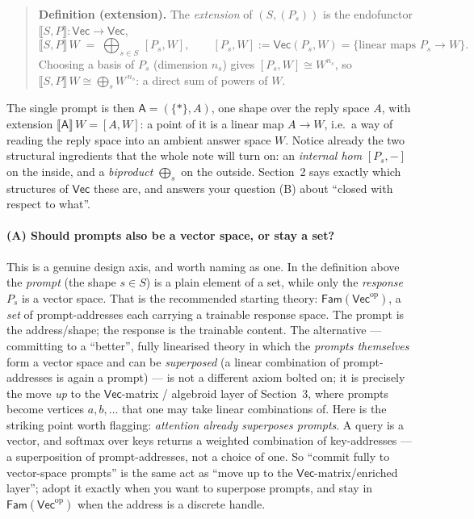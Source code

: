 \documentclass[11pt]{article}
\providecommand{\Vec}{}\renewcommand{\Vec}{\mathsf{Vec}}
\newcommand{\Fam}{\mathsf{Fam}}
\newcommand{\op}{\mathrm{op}}
\newcommand{\ext}[1]{\llbracket #1 \rrbracket}
\newcommand{\ihom}[2]{[#1,#2]}
\begin{document}
\begin{quote}
\textbf{Definition (extension).} The \emph{extension} of $(S,(P_s))$ is the
endofunctor $\ext{S,P}\colon\Vec\to\Vec$,
\[
  \ext{S,P}\,W \;=\; \bigoplus_{s\in S}\, \ihom{P_s}{W},
  \qquad \ihom{P_s}{W} := \Vec(P_s,W) = \{\text{linear maps } P_s\to W\}.
\]
Choosing a basis of $P_s$ (dimension $n_s$) gives $\ihom{P_s}{W}\cong W^{n_s}$, so
$\ext{S,P}\,W \cong \bigoplus_s W^{\,n_s}$: a direct sum of powers of $W$.
\end{quote}

The single prompt is then $\mathsf A=(\{*\},A)$, one shape over the reply space $A$,
with extension $\ext{\mathsf A}\,W=\ihom{A}{W}$: a point of it is a linear map
$A\to W$, i.e.\ a way of reading the reply space into an ambient answer space $W$.
Notice already the two structural ingredients that the whole note will turn on: an
\emph{internal hom} $\ihom{P_s}{-}$ on the inside, and a \emph{biproduct}
$\bigoplus_s$ on the outside. Section~2 says exactly which structures of $\Vec$
these are, and answers your question (B) about ``closed with respect to what''.

\paragraph{(A) Should prompts also be a vector space, or stay a set?}
This is a genuine design axis, and worth naming as one. In the definition above the
\emph{prompt} (the shape $s\in S$) is a plain element of a set, while only the
\emph{response} $P_s$ is a vector space. That is the recommended starting theory:
$\Fam(\Vec^\op)$, a \emph{set} of prompt-addresses each carrying a trainable response
space. The prompt is the address/shape; the response is the trainable content. The
alternative --- committing to a ``better'', fully linearised theory in which the
\emph{prompts themselves} form a vector space and can be \emph{superposed} (a linear
combination of prompt-addresses is again a prompt) --- is not a different axiom bolted
on; it is precisely the move \emph{up} to the $\Vec$-matrix / algebroid layer of
Section~3, where prompts become vertices $a,b,\dots$ that one may take linear
combinations of. Here is the striking point worth flagging: \emph{attention already
superposes prompts}. A query is a vector, and softmax over keys returns a weighted
combination of key-addresses --- a superposition of prompt-addresses, not a choice of
one. So ``commit fully to vector-space prompts'' is the same act as ``move up to the
$\Vec$-matrix/enriched layer''; adopt it exactly when you want to superpose prompts,
and stay in $\Fam(\Vec^\op)$ when the address is a discrete handle.
\end{document}
